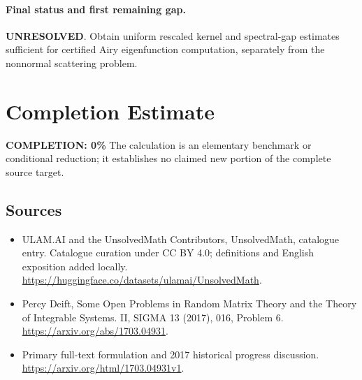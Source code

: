 \documentclass[11pt]{article}
\begin{document}
\paragraph{Final status and first remaining gap.}
\textbf{UNRESOLVED}. Obtain uniform rescaled kernel and spectral-gap estimates sufficient for certified Airy eigenfunction computation, separately from the nonnormal scattering problem.

\section{Completion Estimate}
\noindent\textbf{COMPLETION: 0\%}
The calculation is an elementary benchmark or conditional reduction; it establishes no claimed new portion of the complete source target.

\subsection{Sources}
\begin{itemize}
\item[\hypertarget{source:statement:1}{S1}] ULAM.AI and the UnsolvedMath Contributors, UnsolvedMath, catalogue entry. Catalogue curation under CC BY 4.0; definitions and English exposition added locally.
\url{https://huggingface.co/datasets/ulamai/UnsolvedMath}.
\item[\hypertarget{source:statement:2}{S2}] Percy Deift, Some Open Problems in Random Matrix Theory and the Theory of Integrable Systems. II, SIGMA 13 (2017), 016, Problem 6.
\url{https://arxiv.org/abs/1703.04931}.
\item[\hypertarget{source:statement:3}{S3}] Primary full-text formulation and 2017 historical progress discussion.
\url{https://arxiv.org/html/1703.04931v1}.
\end{itemize}
\label{end:statement}
\end{document}
